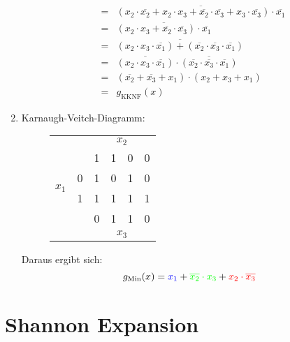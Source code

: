 \documentclass[DIN, pagenumber=false, fontsize=11pt, parskip=half]{scrartcl}
\begin{document}
\begin{enumerate}[label=(\alph*)]
\begin{eqnarray*}
                &=& \overline{(x_2 \cdot \overline{x_2} + x_2 \cdot x_3 + \overline{x_2} \cdot \overline{x_3} + x_3 \cdot \overline{x_3}) \cdot \overline{x_1}}\\
                &=& \overline{(x_2 \cdot x_3 + \overline{x_2} \cdot \overline{x_3}) \cdot \overline{x_1}}\\
                &=& \overline{(x_2 \cdot x_3 \cdot \overline{x_1}) + (\overline{x_2} \cdot \overline{x_3} \cdot \overline{x_1})}\\
                &=& \overline{(x_2 \cdot x_3 \cdot \overline{x_1})} \cdot \overline{(\overline{x_2} \cdot \overline{x_3} \cdot \overline{x_1})}\\
                &=& (\overline{x_2} + \overline{x_3} + x_1) \cdot (x_2 + x_3 + x_1)\\
                &=& g_\text{KKNF}(x)
            \end{eqnarray*}
        \item 
            Karnaugh-Veitch-Diagramm:
            \begin{figure}[H]
                \centering
                \begin{tabular}{cc|cccc}
                    & &  & \multicolumn{2}{c}{$x_2$}\\
                    & & 1 & 1 & 0 & 0\\
                    \midrule
                    \multirow{ 2}{*}{$x_1$} & 0 & \cellcolor{green!25}1& 0 & \cellcolor{red!25}1 & 0\\
                     & 1 & \cellcolor{blue!25}1 & \cellcolor{blue!25}1 & \cellcolor{blue!25}1 & \cellcolor{blue!25}1\\
                    \midrule
                    & & 0 & 1 & 1 & 0\\
                    & &  & \multicolumn{2}{c}{$x_3$}\\
                \end{tabular}
            \end{figure}
            Daraus ergibt sich:
            \begin{equation*}
                g_\text{Min}(x) = \textcolor{blue}{x_1} + \textcolor{green}{\overline{x_2} \cdot x_3} + \textcolor{red}{x_2 \cdot \overline{x_3}}
            \end{equation*}
    \end{enumerate}

    \section{Shannon Expansion}
    \setcounter{subsection}{3}
\end{document}

